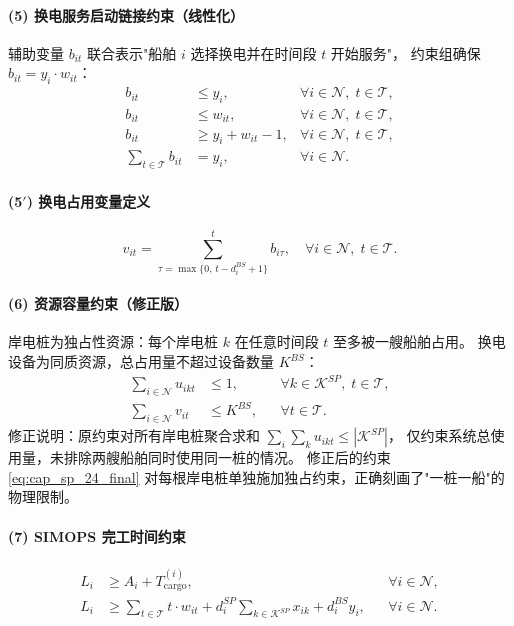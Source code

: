 \documentclass[UTF8, a4paper, 12pt]{ctexart}
\begin{document}
\paragraph{(5) 换电服务启动链接约束（线性化）}
辅助变量 $b_{it}$ 联合表示"船舶 $i$ 选择换电并在时间段 $t$ 开始服务"，
约束组确保 $b_{it} = y_i \cdot w_{it}$：
\begin{align}
b_{it} &\le y_i,
  & \forall i \in \mathcal{N},\; t \in \mathcal{T},
  \label{eq:lin_bs_a} \\
b_{it} &\le w_{it},
  & \forall i \in \mathcal{N},\; t \in \mathcal{T},
  \label{eq:lin_bs_b} \\
b_{it} &\ge y_i + w_{it} - 1,
  & \forall i \in \mathcal{N},\; t \in \mathcal{T},
  \label{eq:lin_bs_c} \\
\sum_{t \in \mathcal{T}} b_{it} &= y_i,
  & \forall i \in \mathcal{N}.
  \label{eq:lin_bs_d}
\end{align}

\paragraph{(5$'$) 换电占用变量定义}
\begin{equation}
v_{it} = \sum_{\tau = \max\{0,\, t-d_i^{BS}+1\}}^{t} b_{i\tau},
\quad \forall i \in \mathcal{N},\; t \in \mathcal{T}.
\label{eq:link_bs_24_final}
\end{equation}

\paragraph{(6) 资源容量约束（修正版）}
岸电桩为独占性资源：每个岸电桩 $k$ 在任意时间段 $t$ 至多被一艘船舶占用。
换电设备为同质资源，总占用量不超过设备数量 $K^{BS}$：
\begin{align}
\sum_{i \in \mathcal{N}} u_{ikt}
&\le 1,
&& \forall k \in \mathcal{K}^{SP},\; t \in \mathcal{T},
\label{eq:cap_sp_24_final} \\
\sum_{i \in \mathcal{N}} v_{it}
&\le K^{BS},
&& \forall t \in \mathcal{T}.
\label{eq:cap_bs_24_final}
\end{align}
修正说明：原约束对所有岸电桩聚合求和 $\sum_{i} \sum_{k} u_{ikt} \le |\mathcal{K}^{SP}|$，
仅约束系统总使用量，未排除两艘船舶同时使用同一桩的情况。
修正后的约束 \eqref{eq:cap_sp_24_final} 对每根岸电桩单独施加独占约束，正确刻画了"一桩一船"的物理限制。

\paragraph{(7) SIMOPS 完工时间约束}
\begin{align}
L_i &\ge A_i + T^{(i)}_{\text{cargo}},
&& \forall i \in \mathcal{N},
\label{eq:cargo_finish_24_final} \\
L_i &\ge 
\sum_{t \in \mathcal{T}} t \cdot w_{it}
+ d_i^{SP}\sum_{k \in \mathcal{K}^{SP}} x_{ik}
+ d_i^{BS} y_i,
&& \forall i \in \mathcal{N}.
\label{eq:service_finish_24_final}
\end{align}
\end{document}
